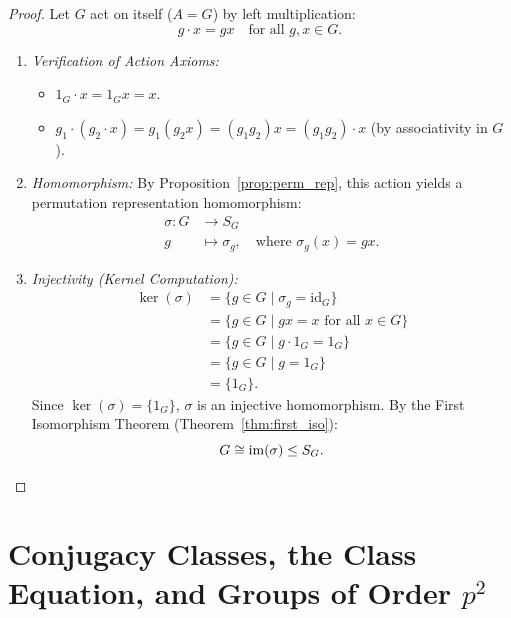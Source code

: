 \begin{proof}
Let $G$ act on itself ($A = G$) by left multiplication:
\begin{equation*}
g \cdot x = gx \quad \text{for all } g, x \in G.
\end{equation*}
\begin{enumerate}[label=\arabic*., leftmargin=*]
    \item \emph{Verification of Action Axioms:}
    \begin{itemize}[leftmargin=1.5em, itemsep=3pt]
        \item $1_G \cdot x = 1_G x = x$.
        \item $g_1 \cdot (g_2 \cdot x) = g_1(g_2 x) = (g_1 g_2)x = (g_1 g_2) \cdot x$ (by associativity in $G$).
    \end{itemize}
    
    \item \emph{Homomorphism:}
    By Proposition~\ref{prop:perm_rep}, this action yields a permutation representation homomorphism:
    \begin{align*}
    \sigma: G &\longrightarrow S_G \\
    g &\longmapsto \sigma_g, \quad \text{where } \sigma_g(x) = gx.
    \end{align*}

    \item \emph{Injectivity (Kernel Computation):}
    \begin{align*}
    \ker(\sigma) &= \{ g \in G \mid \sigma_g = \text{id}_G \} \\
    &= \{ g \in G \mid gx = x \text{ for all } x \in G \} \\
    &= \{ g \in G \mid g \cdot 1_G = 1_G \} \\
    &= \{ g \in G \mid g = 1_G \} \\
    &= \{ 1_G \}.
    \end{align*}
    Since $\ker(\sigma) = \{1_G\}$, $\sigma$ is an injective homomorphism.
    By the First Isomorphism Theorem (Theorem~\ref{thm:first_iso}):
    \begin{equation*}
    G \cong \operatorname{im}(\sigma) \le S_G.
    \end{equation*}
\end{enumerate}
\end{proof}

\section[Conjugacy Classes, the Class Equation, and Groups of Order p\^{}2]{Conjugacy Classes, the Class Equation, and Groups of Order $p^2$}
\label{sec:class_equation}

